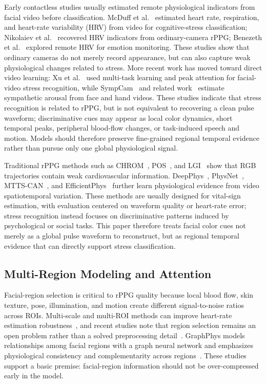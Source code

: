 \documentclass[runningheads]{llncs}
\begin{document}
Early contactless studies usually estimated remote physiological indicators from facial video before classification. McDuff et al.~\cite{mcduff2014remote} estimated heart rate, respiration, and heart-rate variability (HRV) from video for cognitive-stress classification; Nikolaiev et al.~\cite{nikolaiev2020noncontact} recovered HRV indicators from ordinary-camera rPPG; Benezeth et al.~\cite{benezeth2018remotehrv} explored remote HRV for emotion monitoring. These studies show that ordinary cameras do not merely record appearance, but can also capture weak physiological changes related to stress. More recent work has moved toward direct video learning: Xu et al.~\cite{xu2024mtasr} used multi-task learning and peak attention for facial-video stress recognition, while SympCam~\cite{braun2024sympcam} and related work~\cite{braun2023sympathetic} estimate sympathetic arousal from face and hand videos. These studies indicate that stress recognition is related to rPPG, but is not equivalent to recovering a clean pulse waveform; discriminative cues may appear as local color dynamics, short temporal peaks, peripheral blood-flow changes, or task-induced speech and motion. Models should therefore preserve fine-grained regional temporal evidence rather than pursue only one global physiological signal.

Traditional rPPG methods such as CHROM~\cite{dehaan2013chrom}, POS~\cite{wang2017pos}, and LGI~\cite{pilz2018lgi} show that RGB trajectories contain weak cardiovascular information. DeepPhys~\cite{chen2018deepphys}, PhysNet~\cite{yu2019physnet}, MTTS-CAN~\cite{liu2020mttscan}, and EfficientPhys~\cite{liu2023efficientphys} further learn physiological evidence from video spatiotemporal variation. These methods are usually designed for vital-sign estimation, with evaluation centered on waveform quality or heart-rate error; stress recognition instead focuses on discriminative patterns induced by psychological or social tasks. This paper therefore treats facial color cues not merely as a global pulse waveform to reconstruct, but as regional temporal evidence that can directly support stress classification.

\subsection{Multi-Region Modeling and Attention}

Facial-region selection is critical to rPPG quality because local blood flow, skin texture, pose, illumination, and motion create different signal-to-noise ratios across ROIs. Multi-scale and multi-ROI methods can improve heart-rate estimation robustness~\cite{zhao2020multiscale}, and recent studies note that region selection remains an open problem rather than a solved preprocessing detail~\cite{bondarenko2025regions}. GraphPhys models relationships among facial regions with a graph neural network and emphasizes physiological consistency and complementarity across regions~\cite{xiong2023graphphys}. These studies support a basic premise: facial-region information should not be over-compressed early in the model.
\end{document}
